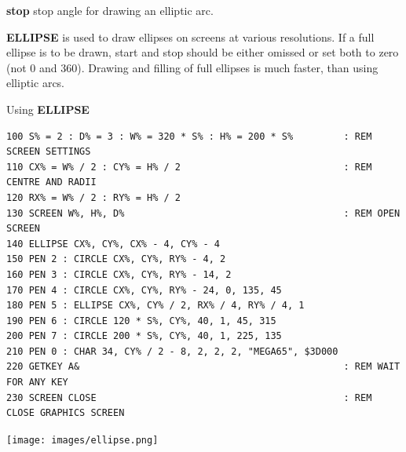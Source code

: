 \begin{description}[leftmargin=2cm,style=nextline]
                  {\bf stop} stop angle for drawing an elliptic arc.

\item [Remarks:]  {\bf ELLIPSE} is used to draw ellipses on screens at various resolutions. If a full ellipse is to be drawn, start and stop should be either omissed or set both to zero (not 0 and 360). Drawing and filling of full ellipses is much faster, than using elliptic arcs.

\item [Example:]  Using {\bf ELLIPSE}

\begin{tcolorbox}[colback=black,coltext=white]
\verbatimfont{\codefont}
\begin{verbatim}
100 S% = 2 : D% = 3 : W% = 320 * S% : H% = 200 * S%         : REM SCREEN SETTINGS
110 CX% = W% / 2 : CY% = H% / 2                             : REM CENTRE AND RADII
120 RX% = W% / 2 : RY% = H% / 2
130 SCREEN W%, H%, D%                                       : REM OPEN SCREEN
140 ELLIPSE CX%, CY%, CX% - 4, CY% - 4
150 PEN 2 : CIRCLE CX%, CY%, RY% - 4, 2
160 PEN 3 : CIRCLE CX%, CY%, RY% - 14, 2
170 PEN 4 : CIRCLE CX%, CY%, RY% - 24, 0, 135, 45
180 PEN 5 : ELLIPSE CX%, CY% / 2, RX% / 4, RY% / 4, 1
190 PEN 6 : CIRCLE 120 * S%, CY%, 40, 1, 45, 315
200 PEN 7 : CIRCLE 200 * S%, CY%, 40, 1, 225, 135
210 PEN 0 : CHAR 34, CY% / 2 - 8, 2, 2, 2, "MEGA65", $3D000
220 GETKEY A&                                               : REM WAIT FOR ANY KEY
230 SCREEN CLOSE                                            : REM CLOSE GRAPHICS SCREEN
\end{verbatim}
\end{tcolorbox}

\item \begin{center}\texttt{[image: images/ellipse.png]}\end{center}
\end{description}


\newpage
